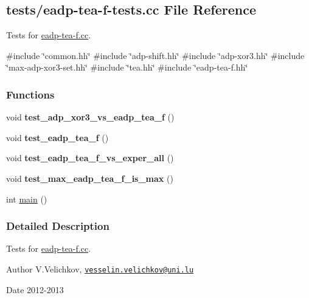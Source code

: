 \hypertarget{eadp-tea-f-tests_8cc}{\subsection{tests/eadp-\/tea-\/f-\/tests.cc \-File \-Reference}
\label{eadp-tea-f-tests_8cc}
}


\-Tests for \hyperlink{eadp-tea-f_8cc}{eadp-\/tea-\/f.\-cc}.  


{\ttfamily \#include \char`\"{}common.\-hh\char`\"{}}\*
{\ttfamily \#include \char`\"{}adp-\/shift.\-hh\char`\"{}}\*
{\ttfamily \#include \char`\"{}adp-\/xor3.\-hh\char`\"{}}\*
{\ttfamily \#include \char`\"{}max-\/adp-\/xor3-\/set.\-hh\char`\"{}}\*
{\ttfamily \#include \char`\"{}tea.\-hh\char`\"{}}\*
{\ttfamily \#include \char`\"{}eadp-\/tea-\/f.\-hh\char`\"{}}\*
\subsubsection*{\-Functions}
\begin{DoxyCompactItemize}
\item 
\hypertarget{eadp-tea-f-tests_8cc_a4700d40239c01394832aaa41955f1ef2}{void {\bfseries test\-\_\-adp\-\_\-xor3\-\_\-vs\-\_\-eadp\-\_\-tea\-\_\-f} ()}\label{eadp-tea-f-tests_8cc_a4700d40239c01394832aaa41955f1ef2}

\item 
\hypertarget{eadp-tea-f-tests_8cc_a1a8d3282df4f905acfbc358ee7388e5e}{void {\bfseries test\-\_\-eadp\-\_\-tea\-\_\-f} ()}\label{eadp-tea-f-tests_8cc_a1a8d3282df4f905acfbc358ee7388e5e}

\item 
\hypertarget{eadp-tea-f-tests_8cc_aca5fefe02162469b421464f0440dcd12}{void {\bfseries test\-\_\-eadp\-\_\-tea\-\_\-f\-\_\-vs\-\_\-exper\-\_\-all} ()}\label{eadp-tea-f-tests_8cc_aca5fefe02162469b421464f0440dcd12}

\item 
\hypertarget{eadp-tea-f-tests_8cc_a62d0fccaa04b8bc27186c70efaa1a9ee}{void {\bfseries test\-\_\-max\-\_\-eadp\-\_\-tea\-\_\-f\-\_\-is\-\_\-max} ()}\label{eadp-tea-f-tests_8cc_a62d0fccaa04b8bc27186c70efaa1a9ee}

\item 
int \hyperlink{eadp-tea-f-tests_8cc_ae66f6b31b5ad750f1fe042a706a4e3d4}{main} ()
\end{DoxyCompactItemize}


\subsubsection{\-Detailed \-Description}
\-Tests for \hyperlink{eadp-tea-f_8cc}{eadp-\/tea-\/f.\-cc}. \begin{DoxyAuthor}{\-Author}
\-V.\-Velichkov, \href{mailto:vesselin.velichkov@uni.lu}{\tt vesselin.\-velichkov@uni.\-lu} 
\end{DoxyAuthor}
\begin{DoxyDate}{\-Date}
2012-\/2013 
\end{DoxyDate}


